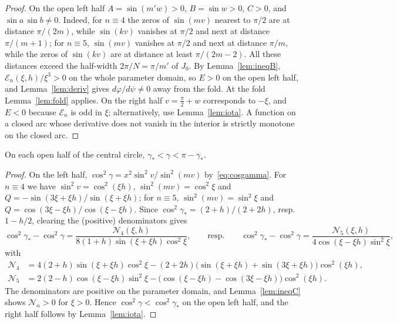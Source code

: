 \begin{proof}
On the open left half $A=\sin(m'w)>0$, $B=\sin w>0$, $C>0$, and $\sin a\,\sin b\neq0$. Indeed, for $n\equiv4$ the zeros of
$\sin(mv)$ nearest to $\pi/2$ are at distance $\pi/(2m)$, while $\sin(kv)$ vanishes at $\pi/2$ and next at distance $\pi/(m+1)$;
for $n\equiv5$, $\sin(mv)$ vanishes at $\pi/2$ and next at distance $\pi/m$, while the zeros of $\sin(kv)$ are at distance at
least $\pi/(2m-2)$. All these distances exceed the half-width $2\pi/N=\pi/m'$ of $J_0$. By Lemma~\ref{lem:ineqB}, $\mathcal E_n(\xi,h)/\xi^3>0$ on the whole parameter domain, so $E>0$ on the open
left half, and Lemma~\ref{lem:deriv} gives $d\varphi/d\psi\neq0$ away from the fold. At the fold Lemma~\ref{lem:fold} applies.
On the right half $v=\frac\pi2+w$ corresponds to $-\xi$, and $E<0$ because $\mathcal E_n$ is odd in $\xi$; alternatively, use
Lemma~\ref{lem:iota}. A function on a closed arc whose derivative does not vanish in the interior is strictly
monotone on the closed arc.
\end{proof}

\begin{proposition}\label{prop:gammaconf}
On each open half of the central circle, $\gamma_*<\gamma<\pi-\gamma_*$.
\end{proposition}

\begin{proof}
On the left half, $\cos^2\gamma=x^2\sin^2v/\sin^2(mv)$ by~\eqref{eq:cosgamma}. For $n\equiv4$ we have $\sin^2v=\cos^2(\xi h)$,
$\sin^2(mv)=\cos^2\xi$ and $Q=-\sin(3\xi+\xi h)/\sin(\xi+\xi h)$; for $n\equiv5$, $\sin^2(mv)=\sin^2\xi$ and
$Q=\cos(3\xi-\xi h)/\cos(\xi-\xi h)$. Since $\cos^2\gamma_*=(2+h)/(2+2h)$, resp.\ $1-h/2$, clearing the (positive) denominators gives
\[
\cos^2\gamma_*-\cos^2\gamma=\frac{\mathcal N_4(\xi,h)}{8(1+h)\sin(\xi+\xi h)\cos^2\xi},\qquad\text{resp.}\qquad
\cos^2\gamma_*-\cos^2\gamma=\frac{\mathcal N_5(\xi,h)}{4\cos(\xi-\xi h)\sin^2\xi},
\]
with
\begin{align*}
\mathcal N_4&=4(2+h)\sin(\xi+\xi h)\cos^2\xi-(2+2h)\bigl(\sin(\xi+\xi h)+\sin(3\xi+\xi h)\bigr)\cos^2(\xi h),\\
\mathcal N_5&=2(2-h)\cos(\xi-\xi h)\sin^2\xi-\bigl(\cos(\xi-\xi h)-\cos(3\xi-\xi h)\bigr)\cos^2(\xi h).
\end{align*}
The denominators are positive on the parameter domain, and Lemma~\ref{lem:ineqC} shows $\mathcal N_n>0$ for $\xi>0$. Hence
$\cos^2\gamma<\cos^2\gamma_*$ on the open left half, and the right half follows by Lemma~\ref{lem:iota}.
\end{proof}

